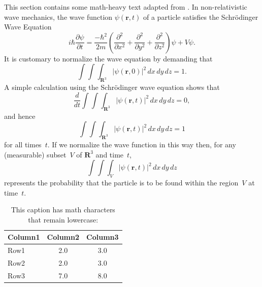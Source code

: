 This section contains some math-heavy text adapted from \iftoggle{usebiblatex}{\textcite{dwilkins1995}}{\citet{dwilkins1995}}.
In non-relativistic wave mechanics, the wave function $\psi(\mathbf{r},t)$ of a particle satisfies the Schrödinger Wave Equation
%
\begin{equation}
 i\hbar\frac{\partial \psi}{\partial t}
  = \frac{-\hbar^2}{2m} \left(
    \frac{\partial^2}{\partial x^2}
    + \frac{\partial^2}{\partial y^2}
    + \frac{\partial^2}{\partial z^2}
  \right) \psi + V \psi.
\end{equation}
%
It is customary to normalize the wave equation by
demanding that
%
\begin{equation}
\int \!\!\! \int \!\!\! \int_{\textbf{R}^3}
      \left| \psi(\mathbf{r},0) \right|^2\,dx\,dy\,dz = 1.
\end{equation}
%
A simple calculation using the Schr\"{o}dinger wave
equation shows that
%
\begin{equation}
\frac{d}{dt} \int \!\!\! \int \!\!\! \int_{\textbf{R}^3}
      \left| \psi(\mathbf{r},t) \right|^2\,dx\,dy\,dz = 0,
\end{equation}
%
and hence
%
\begin{equation}
\int \!\!\! \int \!\!\! \int_{\textbf{R}^3}
      \left| \psi(\mathbf{r},t) \right|^2\,dx\,dy\,dz = 1
\end{equation}
%
for all times~$t$. If we normalize the wave function in this
way then, for any (measurable) subset~$V$ of $\textbf{R}^3$
and time~$t$,
%
\begin{equation}
\int \!\!\! \int \!\!\! \int_V
      \left| \psi(\mathbf{r},t) \right|^2\,dx\,dy\,dz
\end{equation}
%
represents the probability that the particle is to be found
within the region~$V$ at time~$t$.

\begin{table}[h] %
\caption{This caption has math characters that remain lowercase: \relax{} }
\label{table\arabic{tablecounter}}
\begin{tabu}{l c c} \\ \hline
Column1 & Column2 & Column3 \\ \hline
Row1 & 2.0 & 3.0 \\
Row2 & 2.0 & 3.0 \\
Row3 & 7.0 & 8.0 \\ \hline
\end{tabu}
\end{table}
